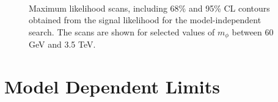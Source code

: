\begin{figure}[!hbtp]
     \\
\caption{Maximum likelihood scans, including 68\% and 95\% CL contours obtained from the signal likelihood for the model-independent search. The scans are shown for selected values of $m_{\phi}$ between 60 GeV and 3.5 TeV.}
\label{fig:2d_likelihood_scans}
\end{figure}

\section{Model Dependent Limits}

